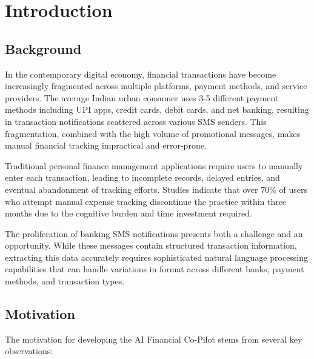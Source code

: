 \documentclass[11pt,a4paper]{report}
\begin{document}
\newpage

\chapter{Introduction}

\section{Background}

In the contemporary digital economy, financial transactions have become increasingly fragmented across multiple platforms, payment methods, and service providers. The average Indian urban consumer uses 3-5 different payment methods including UPI apps, credit cards, debit cards, and net banking, resulting in transaction notifications scattered across various SMS senders. This fragmentation, combined with the high volume of promotional messages, makes manual financial tracking impractical and error-prone.

Traditional personal finance management applications require users to manually enter each transaction, leading to incomplete records, delayed entries, and eventual abandonment of tracking efforts. Studies indicate that over 70\% of users who attempt manual expense tracking discontinue the practice within three months due to the cognitive burden and time investment required.

The proliferation of banking SMS notifications presents both a challenge and an opportunity. While these messages contain structured transaction information, extracting this data accurately requires sophisticated natural language processing capabilities that can handle variations in format across different banks, payment methods, and transaction types.

\section{Motivation}

The motivation for developing the AI Financial Co-Pilot stems from several key observations:
\end{document}
